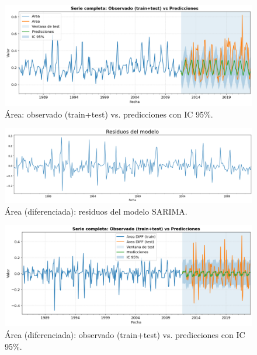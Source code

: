 \begin{figure}[H]\centering
\includegraphics[scale=.42]{Figures/pred_area.png}
\caption{Área: observado (train+test) vs. predicciones con IC 95\%.}
\label{fig:pred_area}
\end{figure}


\begin{figure}[H]\centering
\includegraphics[scale=.30]{Figures/res_sarima_area_d.png}
\caption{Área (diferenciada): residuos del modelo SARIMA.}
\label{fig:res_area_d}
\end{figure}


\begin{figure}[H]\centering
\includegraphics[scale=.42]{Figures/pred_area_d.png}
\caption{Área (diferenciada): observado (train+test) vs. predicciones con IC 95\%.}
\label{fig:pred_area_d}
\end{figure}

